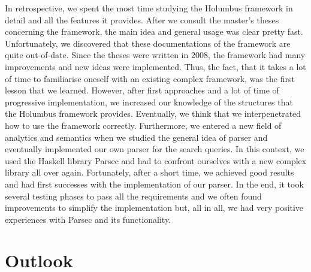 \documentclass[%
	latex,%
	a4paper,%
	oneside,%
	chapterprefix,%
	headsepline,%
	12pt%
]{scrbook}
\begin{document}
In retrospective, we spent the most time studying the Holumbus
framework in detail and all the features it provides. %
After we consult the master's theses concerning the framework, the
main idea and general usage was clear pretty fast. %
Unfortunately, we discovered that these documentations of the
framework are quite out-of-date. %
Since the theses were written in 2008, the framework had many
improvements and new ideas were implemented. %
Thus, the fact, that it takes a lot of time to familiarise oneself
with an existing complex framework, was the first lesson that we
learned. %
However, after first approaches and a lot of time of progressive
implementation, we increased our knowledge of the structures that the
Holumbus framework provides. %
Eventually, we think that we interpenetrated how to use the framework
correctly. %
Furthermore, we entered a new field of analytics and semantics when we
studied the general idea of parser and eventually implemented our own
parser for the search queries. %
In this context, we used the Haskell library Parsec and had to
confront ourselves with a new complex library all over again. %
Fortunately, after a short time, we achieved good results and had
first successes with the implementation of our parser. %
In the end, it took several testing phases to pass all the
requirements and we often found improvements to simplify the
implementation but, all in all, we had very positive experiences with
Parsec and its functionality.\\ %


\section{Outlook}
\end{document}
